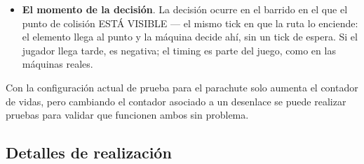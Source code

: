 \begin{itemize}
\begin{itemize}
\begin{itemize}
			\item \textbf{En la pantalla}: En una iteración posterior se usarán para presentar en la pantalla su número en los juegos que lo requieran, por ejemplo en parachute hay un número que representa los paracaidistas salvados, se usará el contador de vidas para ello.
		\end{itemize}
	\end{itemize}
	
	\item \textbf{El momento de la decisión}. La decisión ocurre en el barrido en el
	que el punto de colisión ESTÁ VISIBLE --- el mismo tick en que la ruta lo
	enciende: el elemento llega al punto y la máquina decide ahí, sin un tick de
	espera. Si el jugador llega tarde, es negativa; el timing es parte del juego,
	como en las máquinas reales.
\end{itemize}

Con la configuración actual de prueba para el parachute solo aumenta el contador de vidas, pero cambiando el contador asociado a un desenlace se puede realizar pruebas para validar que funcionen ambos sin problema.

\subsection{Detalles de realización}
\label{subsec:DetallesF3I8}

